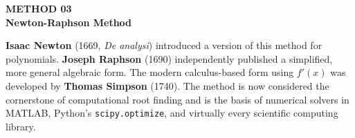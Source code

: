 \documentclass[12pt]{article}
\begin{document}

\begin{tcolorbox}[
  enhanced, arc=0pt, boxrule=0pt,
  colback=primary, colframe=primary,
  left=16pt, right=16pt, top=14pt, bottom=10pt,
  borderline south={4pt}{0pt}{accent},
]
  {\color{accent!70}\small\bfseries METHOD 03}\\[4pt]
  {\LARGE\bfseries\color{white} Newton-Raphson Method}
\end{tcolorbox}

\vspace{10pt}

\begin{histbox}
\textbf{Isaac Newton} (1669, \textit{De analysi}) introduced a version of this method for polynomials. \textbf{Joseph Raphson} (1690) independently published a simplified, more general algebraic form. The modern calculus-based form using $f'(x)$ was developed by \textbf{Thomas Simpson} (1740). The method is now considered the cornerstone of computational root finding and is the basis of numerical solvers in MATLAB, Python's \texttt{scipy.optimize}, and virtually every scientific computing library.
\end{histbox}

\bigskip
\end{document}
